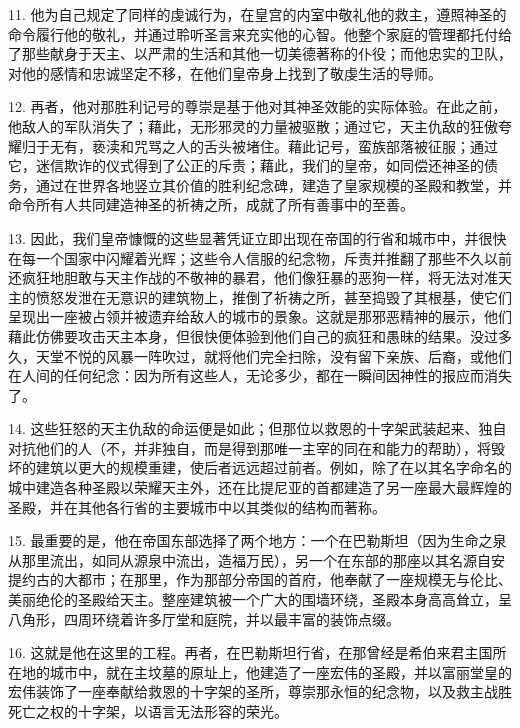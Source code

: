 11. 他为自己规定了同样的虔诚行为，在皇宫的内室中敬礼他的救主，遵照神圣的命令履行他的敬礼，并通过聆听圣言来充实他的心智。他整个家庭的管理都托付给了那些献身于天主、以严肃的生活和其他一切美德著称的仆役；而他忠实的卫队，对他的感情和忠诚坚定不移，在他们皇帝身上找到了敬虔生活的导师。\par

12. 再者，他对那胜利记号的尊崇是基于他对其神圣效能的实际体验。在此之前，他敌人的军队消失了；藉此，无形邪灵的力量被驱散；通过它，天主仇敌的狂傲夸耀归于无有，亵渎和咒骂之人的舌头被堵住。藉此记号，蛮族部落被征服；通过它，迷信欺诈的仪式得到了公正的斥责；藉此，我们的皇帝，如同偿还神圣的债务，通过在世界各地竖立其价值的胜利纪念碑，建造了皇家规模的圣殿和教堂，并命令所有人共同建造神圣的祈祷之所，成就了所有善事中的至善。\par

13. 因此，我们皇帝慷慨的这些显著凭证立即出现在帝国的行省和城市中，并很快在每一个国家中闪耀着光辉；这些令人信服的纪念物，斥责并推翻了那些不久以前还疯狂地胆敢与天主作战的不敬神的暴君，他们像狂暴的恶狗一样，将无法对准天主的愤怒发泄在无意识的建筑物上，推倒了祈祷之所，甚至捣毁了其根基，使它们呈现出一座被占领并被遗弃给敌人的城市的景象。这就是那邪恶精神的展示，他们藉此仿佛要攻击天主本身，但很快便体验到他们自己的疯狂和愚昧的结果。没过多久，天堂不悦的风暴一阵吹过，就将他们完全扫除，没有留下亲族、后裔，或他们在人间的任何纪念：因为所有这些人，无论多少，都在一瞬间因神性的报应而消失了。\par

14. 这些狂怒的天主仇敌的命运便是如此；但那位以救恩的十字架武装起来、独自对抗他们的人（不，并非独自，而是得到那唯一主宰的同在和能力的帮助），将毁坏的建筑以更大的规模重建，使后者远远超过前者。例如，除了在以其名字命名的城中建造各种圣殿以荣耀天主外，还在比提尼亚的首都建造了另一座最大最辉煌的圣殿，并在其他各行省的主要城市中以其类似的结构而著称。\par

15. 最重要的是，他在帝国东部选择了两个地方：一个在巴勒斯坦（因为生命之泉从那里流出，如同从源泉中流出，造福万民），另一个在东部的那座以其名源自安提约古的大都市；在那里，作为那部分帝国的首府，他奉献了一座规模无与伦比、美丽绝伦的圣殿给天主。整座建筑被一个广大的围墙环绕，圣殿本身高高耸立，呈八角形，四周环绕着许多厅堂和庭院，并以最丰富的装饰点缀。\par

16. 这就是他在这里的工程。再者，在巴勒斯坦行省，在那曾经是希伯来君主国所在地的城市中，就在主坟墓的原址上，他建造了一座宏伟的圣殿，并以富丽堂皇的宏伟装饰了一座奉献给救恩的十字架的圣所，尊崇那永恒的纪念物，以及救主战胜死亡之权的十字架，以语言无法形容的荣光。\par

